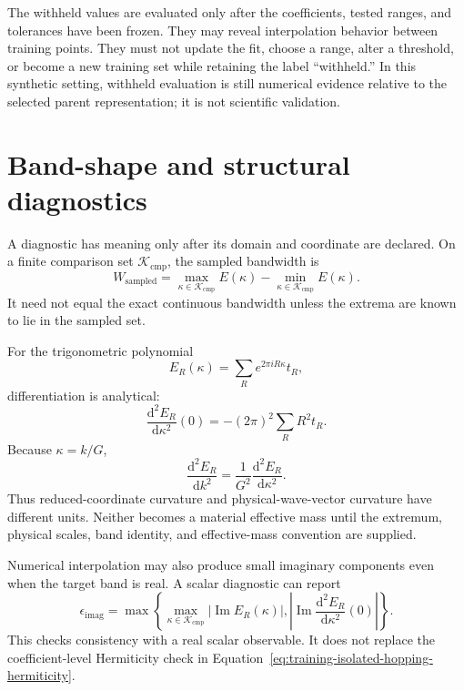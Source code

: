 The withheld values are evaluated only after the coefficients, tested ranges,
and tolerances have been frozen. They may reveal interpolation behavior between
training points. They must not update the fit, choose a range, alter a threshold,
or become a new training set while retaining the label ``withheld.'' In this
synthetic setting, withheld evaluation is still numerical evidence relative to
the selected parent representation; it is not scientific validation.

\section{Band-shape and structural diagnostics}

A diagnostic has meaning only after its domain and coordinate are declared. On
a finite comparison set $\mathcal K_{\mathrm{cmp}}$, the sampled bandwidth is
\begin{equation}
  W_{\mathrm{sampled}}
  =\max_{\kappa\in\mathcal K_{\mathrm{cmp}}}E(\kappa)
   -\min_{\kappa\in\mathcal K_{\mathrm{cmp}}}E(\kappa).
  \label{eq:training-isolated-bandwidth}
\end{equation}
It need not equal the exact continuous bandwidth unless the extrema are known
to lie in the sampled set.

For the trigonometric polynomial
\begin{equation}
  E_R(\kappa)=\sum_R e^{2\pi iR\kappa}t_R,
\end{equation}
differentiation is analytical:
\begin{equation}
  \frac{\mathrm d^2E_R}{\mathrm d\kappa^2}(0)
  =-(2\pi)^2\sum_R R^2t_R.
  \label{eq:training-isolated-reduced-curvature}
\end{equation}
Because $\kappa=k/G$,
\begin{equation}
  \frac{\mathrm d^2E_R}{\mathrm d k^2}
  =\frac{1}{G^2}
   \frac{\mathrm d^2E_R}{\mathrm d\kappa^2}.
  \label{eq:training-isolated-physical-curvature}
\end{equation}
Thus reduced-coordinate curvature and physical-wave-vector curvature have
different units. Neither becomes a material effective mass until the extremum,
physical scales, band identity, and effective-mass convention are supplied.

Numerical interpolation may also produce small imaginary components even when
the target band is real. A scalar diagnostic can report
\begin{equation}
  \epsilon_{\mathrm{imag}}
  =\max\left\{
    \max_{\kappa\in\mathcal K_{\mathrm{cmp}}}
      |\operatorname{Im}E_R(\kappa)|,
    \left|
      \operatorname{Im}
      \frac{\mathrm d^2E_R}{\mathrm d\kappa^2}(0)
    \right|
  \right\}.
  \label{eq:training-isolated-imaginary-residual}
\end{equation}
This checks consistency with a real scalar observable. It does not replace the
coefficient-level Hermiticity check in
Equation~\eqref{eq:training-isolated-hopping-hermiticity}.

